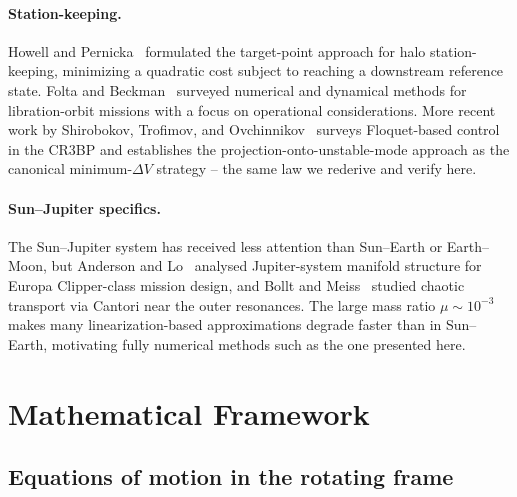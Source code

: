 \documentclass[11pt,a4paper]{article}
\begin{document}
\paragraph{Station-keeping.}
Howell and Pernicka~\cite{howell1993} formulated the target-point approach for halo station-keeping, minimizing a quadratic cost subject to reaching a downstream reference state. Folta and Beckman~\cite{folta2003} surveyed numerical and dynamical methods for libration-orbit missions with a focus on operational considerations. More recent work by Shirobokov, Trofimov, and Ovchinnikov~\cite{shirobokov2017} surveys Floquet-based control in the CR3BP and establishes the projection-onto-unstable-mode approach as the canonical minimum-$\Delta V$ strategy -- the same law we rederive and verify here.

\paragraph{Sun--Jupiter specifics.}
The Sun--Jupiter system has received less attention than Sun--Earth or Earth--Moon, but Anderson and Lo~\cite{anderson2011} analysed Jupiter-system manifold structure for Europa Clipper-class mission design, and Bollt and Meiss~\cite{bollt1995} studied chaotic transport via Cantori near the outer resonances. The large mass ratio $\mu \sim 10^{-3}$ makes many linearization-based approximations degrade faster than in Sun--Earth, motivating fully numerical methods such as the one presented here.

\section{Mathematical Framework}\label{sec:math}

\subsection{Equations of motion in the rotating frame}
\end{document}
